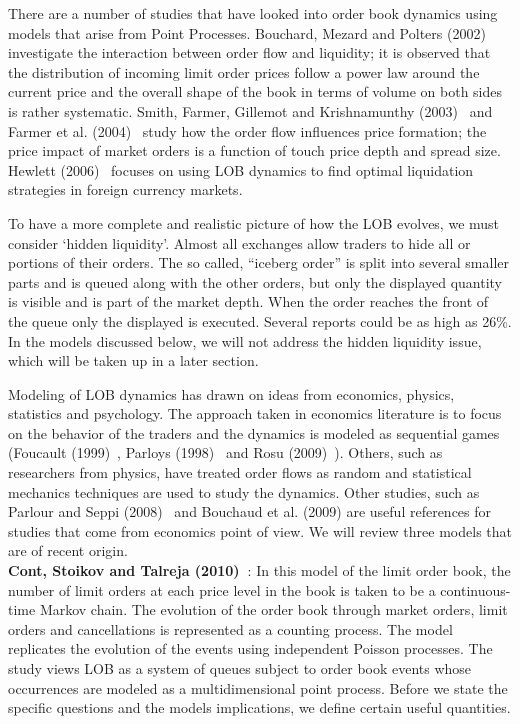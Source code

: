 There are a number of studies that have looked into order book dynamics using models that arise from Point Processes. Bouchard, Mezard and Polters (2002)~\cite{bouchardmezard} investigate the interaction between order flow and liquidity; it is observed that the distribution of incoming limit order prices follow a power law around the current price and the overall shape of the book in terms of volume on both sides is rather systematic. Smith, Farmer, Gillemot and Krishnamunthy (2003)~\cite{smithfarm} and Farmer et al. (2004)~\cite{} study how the order flow influences price formation; the price impact of market orders is a function of touch price depth and spread size. Hewlett (2006)~\cite{} focuses on using LOB dynamics to find optimal liquidation strategies in foreign currency markets. 


To have a more complete and realistic picture of how the LOB evolves, we must consider `hidden liquidity'. Almost all exchanges allow traders to hide all or portions of their orders. The so called, ``iceberg order'' is split into several smaller parts and is queued along with the other orders, but only the displayed quantity is visible and is part of the market depth. When the order reaches the front of the queue only the displayed is executed. Several reports could be as high as 26\%. In the models discussed below, we will not address the hidden liquidity issue, which will be taken up in a later section.


Modeling of LOB dynamics has drawn on ideas from economics, physics, statistics and psychology. The approach taken in economics literature is to focus on the behavior of the traders and the dynamics is modeled as sequential games (Foucault (1999)~\cite{}, Parloys (1998)~\cite{} and Rosu (2009)~\cite{}). Others, such as researchers from physics, have treated order flows as random and statistical mechanics techniques are used to study the dynamics. Other studies, such as Parlour and Seppi (2008)~\cite{parseppi} and Bouchaud et al. (2009) are useful references for studies that come from economics point of view. We will review three models that are of recent origin. \\


\noindent\textbf{Cont, Stoikov and Talreja (2010)~\cite{contstoi}}: In this model of the limit order book, the number of limit orders at each price level in the book is taken to be a continuous-time Markov chain. The evolution of the order book through market orders, limit orders and cancellations is represented as a counting process. The model replicates the evolution of the events using independent Poisson processes. The study views LOB as a system of queues subject to order book events whose occurrences are modeled as a multidimensional point process. Before we state the specific questions and the models implications, we define certain useful quantities. 


